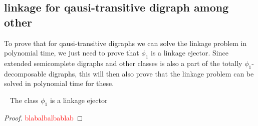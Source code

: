 \subsection{linkage for qausi-transitive digraph among other}
To prove that for qausi-transitive digraphs we can solve the linkage problem in polynomial time, we just need to prove that $\phi_1$ is a linkage ejector. 
Since extended semicomplete digraphs and other classes is also a part of the totally $\phi_1$-decomposable digraphs, this will then also prove that the linkage problem can be solved in polynomial time for these.

\begin{lemma}~\cite{bangJGT85}
    The class $\phi_1$ is a linkage ejector
\end{lemma}
\begin{proof}
    \textcolor{red}{blabalbalbablab}
\end{proof}
